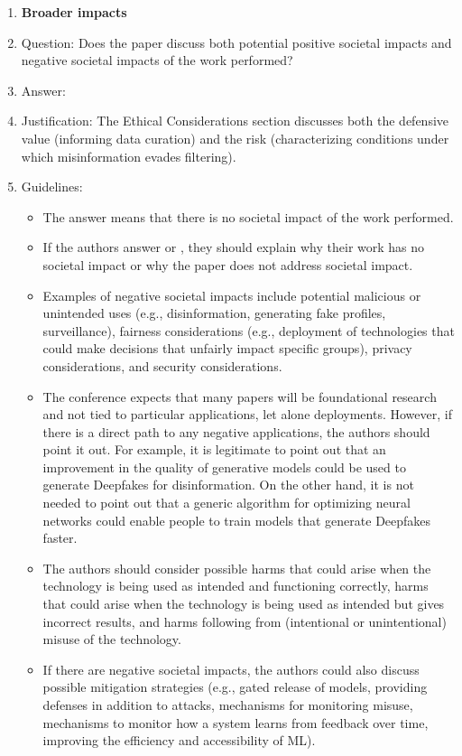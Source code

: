 \documentclass{article}
\begin{document}
\begin{enumerate}
\item {\bf Broader impacts}
    \item[] Question: Does the paper discuss both potential positive societal impacts and negative societal impacts of the work performed?
    \item[] Answer: \answerYes{}
    \item[] Justification: The Ethical Considerations section discusses both the defensive value (informing data curation) and the risk (characterizing conditions under which misinformation evades filtering).
    \item[] Guidelines:
    \begin{itemize}
        \item The answer \answerNA{} means that there is no societal impact of the work performed.
        \item If the authors answer \answerNA{} or \answerNo, they should explain why their work has no societal impact or why the paper does not address societal impact.
        \item Examples of negative societal impacts include potential malicious or unintended uses (e.g., disinformation, generating fake profiles, surveillance), fairness considerations (e.g., deployment of technologies that could make decisions that unfairly impact specific groups), privacy considerations, and security considerations.
        \item The conference expects that many papers will be foundational research and not tied to particular applications, let alone deployments. However, if there is a direct path to any negative applications, the authors should point it out. For example, it is legitimate to point out that an improvement in the quality of generative models could be used to generate Deepfakes for disinformation. On the other hand, it is not needed to point out that a generic algorithm for optimizing neural networks could enable people to train models that generate Deepfakes faster.
        \item The authors should consider possible harms that could arise when the technology is being used as intended and functioning correctly, harms that could arise when the technology is being used as intended but gives incorrect results, and harms following from (intentional or unintentional) misuse of the technology.
        \item If there are negative societal impacts, the authors could also discuss possible mitigation strategies (e.g., gated release of models, providing defenses in addition to attacks, mechanisms for monitoring misuse, mechanisms to monitor how a system learns from feedback over time, improving the efficiency and accessibility of ML).
    \end{itemize}


\end{enumerate}
\end{document}
